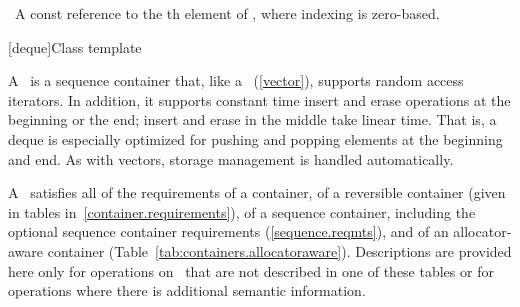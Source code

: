 \documentclass[american,twoside]{book}
\begin{document}
\begin{itemdescr}
\pnum
{}

\pnum
\returns\ A const reference to the th element of , 
where indexing is zero-based.
\end{itemdescr}

[deque]{Class template }%

\pnum
{}
A
\
is a sequence container that, like a
\
(\ref{vector}), supports random access iterators.
In addition, it supports constant time insert and erase operations at the beginning or the end;
insert and erase in the middle take linear time.
That is, a deque is especially optimized for pushing and popping elements at the beginning and end.
As with vectors, storage management is handled automatically.

\pnum
A
\
satisfies all of the requirements of a container, of a reversible container
(given in tables in~\ref{container.requirements}), of a sequence container,
including the optional sequence container requirements
(\ref{sequence.reqmts}), and of an allocator-aware container (Table~\ref{tab:containers.allocatoraware}).
Descriptions are provided here only for operations on
\tcode{deque}\
that are not described in one of these tables
or for operations where there is additional semantic information.
\end{document}
